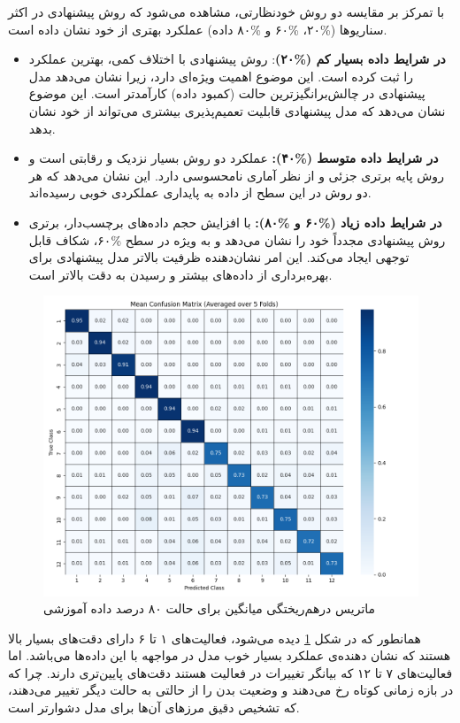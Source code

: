 با تمرکز بر مقایسه دو روش خودنظارتی، مشاهده می‌شود که روش پیشنهادی در اکثر سناریوها (\%۲۰، \%۶۰ و \%۸۰ داده) عملکرد بهتری از خود نشان داده است.
\begin{itemize}
    \item \textbf{در شرایط داده بسیار کم (\%۲۰)}: روش پیشنهادی با اختلاف کمی، بهترین عملکرد را ثبت کرده است. این موضوع اهمیت ویژه‌ای دارد، زیرا نشان می‌دهد مدل پیشنهادی در چالش‌برانگیزترین حالت (کمبود داده) کارآمدتر است. این موضوع نشان می‌دهد که مدل پیشنهادی قابلیت تعمیم‌پذیری بیشتری می‌تواند از خود نشان بدهد.
    \item \textbf{در شرایط داده متوسط (\%۴۰):} عملکرد دو روش بسیار نزدیک و رقابتی است و روش پایه برتری جزئی و از نظر آماری نامحسوسی دارد. این نشان می‌دهد که هر دو روش در این سطح از داده به پایداری عملکردی خوبی رسیده‌اند.
    \item \textbf{در شرایط داده زیاد (\%۶۰ و \%۸۰):} با افزایش حجم داده‌های برچسب‌دار، برتری روش پیشنهادی مجدداً خود را نشان می‌دهد و به ویژه در سطح \%۶۰، شکاف قابل توجهی ایجاد می‌کند. این امر نشان‌دهنده ظرفیت بالاتر مدل پیشنهادی برای بهره‌برداری از داده‌های بیشتر و رسیدن به دقت بالاتر است.
\end{itemize}

\begin{figure}[htb!]
  \centering
  \includegraphics[width=1\textwidth]{Images/Chapter4/confusion-main.png}
  \caption{ماتریس درهم‌ریختگی میانگین برای حالت ۸۰ درصد داده آموزشی}
  \label{fig:confusion-main}
\end{figure}

همانطور که در شکل \ref{fig:confusion-main} دیده می‌شود، فعالیت‌های ۱ تا ۶ دارای دقت‌های بسیار بالا هستند که نشان دهنده‌ی عملکرد بسیار خوب مدل در مواجهه با این داده‌ها می‌باشد. اما فعالیت‌های ۷ تا ۱۲ که بیانگر تغییرات در فعالیت هستند دقت‌های پایین‌تری دارند. چرا که در بازه زمانی کوتاه رخ می‌دهند و وضعیت بدن را از حالتی به حالت دیگر تغییر می‌دهند، که تشخیص دقیق مرزهای آن‌ها برای مدل دشوارتر است.

